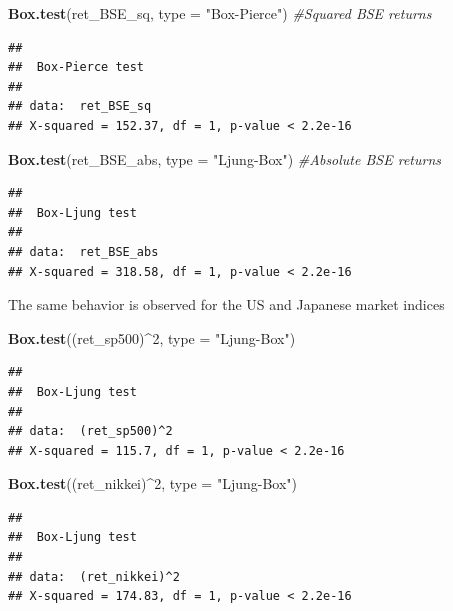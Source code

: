 \documentclass[11pt,]{article}
\newenvironment{Shaded}{\begin{snugshade}}{\end{snugshade}}
\newcommand{\KeywordTok}[1]{\textcolor[rgb]{0.13,0.29,0.53}{\textbf{#1}}}
\newcommand{\DataTypeTok}[1]{\textcolor[rgb]{0.13,0.29,0.53}{#1}}
\newcommand{\DecValTok}[1]{\textcolor[rgb]{0.00,0.00,0.81}{#1}}
\newcommand{\StringTok}[1]{\textcolor[rgb]{0.31,0.60,0.02}{#1}}
\newcommand{\CommentTok}[1]{\textcolor[rgb]{0.56,0.35,0.01}{\textit{#1}}}
\newcommand{\OperatorTok}[1]{\textcolor[rgb]{0.81,0.36,0.00}{\textbf{#1}}}
\newcommand{\NormalTok}[1]{#1}
\begin{document}
\begin{Shaded}
\begin{Highlighting}[]
\KeywordTok{Box.test}\NormalTok{(ret_BSE_sq, }\DataTypeTok{type =} \StringTok{"Box-Pierce"}\NormalTok{) }\CommentTok{#Squared BSE returns}
\end{Highlighting}
\end{Shaded}

\begin{verbatim}
## 
##  Box-Pierce test
## 
## data:  ret_BSE_sq
## X-squared = 152.37, df = 1, p-value < 2.2e-16
\end{verbatim}

\begin{Shaded}
\begin{Highlighting}[]
\KeywordTok{Box.test}\NormalTok{(ret_BSE_abs, }\DataTypeTok{type =} \StringTok{"Ljung-Box"}\NormalTok{) }\CommentTok{#Absolute BSE returns}
\end{Highlighting}
\end{Shaded}

\begin{verbatim}
## 
##  Box-Ljung test
## 
## data:  ret_BSE_abs
## X-squared = 318.58, df = 1, p-value < 2.2e-16
\end{verbatim}

The same behavior is observed for the US and Japanese market indices

\begin{Shaded}
\begin{Highlighting}[]
\KeywordTok{Box.test}\NormalTok{((ret_sp500)}\OperatorTok{^}\DecValTok{2}\NormalTok{, }\DataTypeTok{type =} \StringTok{"Ljung-Box"}\NormalTok{) }
\end{Highlighting}
\end{Shaded}

\begin{verbatim}
## 
##  Box-Ljung test
## 
## data:  (ret_sp500)^2
## X-squared = 115.7, df = 1, p-value < 2.2e-16
\end{verbatim}

\begin{Shaded}
\begin{Highlighting}[]
\KeywordTok{Box.test}\NormalTok{((ret_nikkei)}\OperatorTok{^}\DecValTok{2}\NormalTok{, }\DataTypeTok{type =} \StringTok{"Ljung-Box"}\NormalTok{) }
\end{Highlighting}
\end{Shaded}

\begin{verbatim}
## 
##  Box-Ljung test
## 
## data:  (ret_nikkei)^2
## X-squared = 174.83, df = 1, p-value < 2.2e-16
\end{verbatim}
\end{document}
